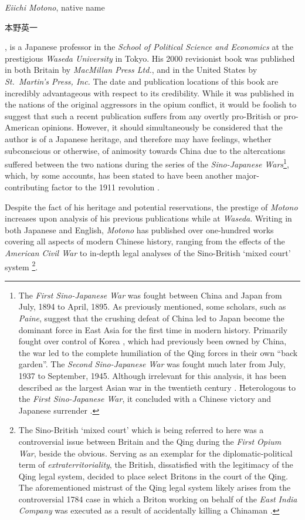 \documentclass[a4paper,oneside]{article}
\newcommand{\jap}[1]{%
        \begin{CJK*}{UTF8}{min}%
                \normalfont%
                #1
        \end{CJK*}
}
\begin{document}
\textit{Eiichi Motono}, native name \jap{本野英一}, is a Japanese professor in
the \textit{School of Political Science and Economics} at the prestigious
\textit{Waseda University} in Tokyo. His 2000 revisionist book was published in
both Britain by \textit{MacMillan Press Ltd.}, and in the United States by
\textit{St.\ Martin's Press, Inc.} The date and publication locations of this
book are incredibly advantageous with respect to its credibility. While it was
published in the nations of the original aggressors in the opium conflict, it
would be foolish to suggest that such a recent publication suffers from any
overtly pro-British or pro-American opinions. However, it should simultaneously
be considered that the author is of a Japanese heritage, and therefore may have
feelings, whether subconscious or otherwise, of animosity towards China due to
the altercations suffered between the two nations during the series of the
\textit{Sino-Japanese Wars}\footnote{The \textit{First Sino-Japanese War} was
fought between China and Japan from  July, 1894 to  April, 1895.
As previously mentioned, some scholars, such as \textit{Paine}, suggest that the
crushing defeat of China led to Japan become the dominant force in East Asia for
the first time in modern history. Primarily fought over control of Korea
\autocite{Olender:2014}, which had previously been owned by China, the war led
to the complete humiliation of the Qing forces in their own ``back garden''. The
\textit{Second Sino-Japanese War} was fought much later from  July, 1937
to  September, 1945. Although irrelevant for this analysis, it has been
described as the largest Asian war in the twentieth century \autocite{Bix:1992}.
Heterologous to the \textit{First Sino-Japanese War}, it concluded with a
Chinese victory and Japanese surrender \autocite{Kitamura:2014}.}, which, by
some accounts, has been stated to have been another major-contributing factor to
the 1911 revolution \autocite{Paine:2009}.

Despite the fact of his heritage and potential reservations, the prestige of
\textit{Motono} increases upon analysis of his previous publications while at
\textit{Waseda}. Writing in both Japanese and English, \textit{Motono} has
published over one-hundred works covering all aspects of modern Chinese history,
ranging from the effects of the \textit{American Civil War}
\autocite{Motono:1984} to in-depth legal analyses of the Sino-British `mixed
court' system \autocite{Motono:1996}\footnote{The Sino-British `mixed court'
which is being referred to here was a controversial issue between Britain and
the Qing during the \textit{First Opium War}, beside the obvious. Serving as an
exemplar for the diplomatic-political term of \textit{extraterritoriality}, the
British, dissatisfied with the legitimacy of the Qing legal system, decided to
place select Britons in the court of the Qing. The aforementioned mistrust of
the Qing legal system likely arises from the controversial 1784 case in which a
Briton working on behalf of the \textit{East India Company} was executed as a
result of accidentally killing a Chinaman \autocite{Cassel:2012}.}.
\end{document}
